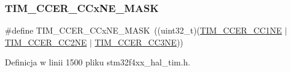 \subsubsection{\texorpdfstring{T\+I\+M\+\_\+\+C\+C\+E\+R\+\_\+\+C\+Cx\+N\+E\+\_\+\+M\+A\+SK}{TIM\_CCER\_CCxNE\_MASK}}
{\footnotesize\ttfamily \#define T\+I\+M\+\_\+\+C\+C\+E\+R\+\_\+\+C\+Cx\+N\+E\+\_\+\+M\+A\+SK~((uint32\+\_\+t)(\hyperlink{group___peripheral___registers___bits___definition_ga813056b3f90a13c4432aeba55f28957e}{T\+I\+M\+\_\+\+C\+C\+E\+R\+\_\+\+C\+C1\+NE} $\vert$ \hyperlink{group___peripheral___registers___bits___definition_ga6a784649120eddec31998f34323d4156}{T\+I\+M\+\_\+\+C\+C\+E\+R\+\_\+\+C\+C2\+NE} $\vert$ \hyperlink{group___peripheral___registers___bits___definition_gad46cce61d3bd83b64257ba75e54ee1aa}{T\+I\+M\+\_\+\+C\+C\+E\+R\+\_\+\+C\+C3\+NE}))}



Definicja w linii 1500 pliku stm32f4xx\+\_\+hal\+\_\+tim.\+h.

